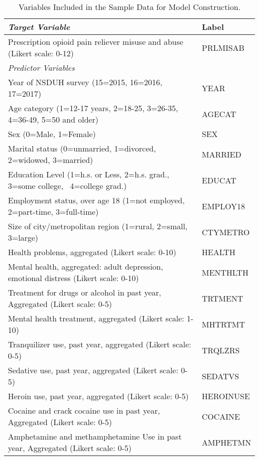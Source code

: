 \documentclass[sigconf]{acmart}
\begin{document}
\begin{table*}[ht]
  \caption{Variables Included in the Sample Data for Model Construction.}
  \label{tab:freq}
  \begin{tabular}{ll}
    \toprule
    \textit{Target Variable} & Label \\
    \midrule
    Prescription opioid pain reliever misuse and abuse 
    (Likert scale: 0-12)& PRLMISAB  \\
    \midrule
    \textit{Predictor Variables}&   \\
    \midrule
    Year of NSDUH survey (15=2015, 16=2016, 17=2017) & YEAR  \\
    Age category (1=12-17 years, 2=18-25, 3=26-35, 4=36-49, 5=50 and older)& AGECAT \\
    Sex (0=Male, 1=Female)& SEX  \\
    Marital status (0=unmarried, 1=divorced, 2=widowed, 3=married)& MARRIED  \\
    Education Level (1=h.s. or Less, 2=h.s. grad., 3=some college,  4=college grad.)& EDUCAT  \\
    Employment status, over age 18 (1=not employed, 2=part-time, 3=full-time) & EMPLOY18  \\
    Size of city/metropolitan region (1=rural, 2=small, 3=large)& CTYMETRO  \\
    Health problems, aggregated  (Likert scale: 0-10)& HEALTH  \\
    Mental health, aggregated: adult depression, emotional distress 
    (Likert scale: 0-10)& MENTHLTH  \\
    Treatment for drugs or alcohol in past year, Aggregated 
    (Likert scale: 0-5)& TRTMENT  \\
    Mental health treatment, aggregated (Likert scale: 1-10)& MHTRTMT  \\
    Tranquilizer use, past year, aggregated (Likert scale: 0-5)& TRQLZRS \\
    Sedative use, past year, aggregated (Likert scale: 0-5)& SEDATVS  \\
    Heroin use, past year, aggregated (Likert scale: 0-5)& HEROINUSE  \\
    Cocaine and crack cocaine use in past year, Aggregated  
    (Likert scale: 0-5)& COCAINE  \\
    Amphetamine and methamphetamine Use in past year, Aggregated 
    (Likert scale: 0-5)& AMPHETMN  \\
    \bottomrule
  \end{tabular}
\end{table*}
\end{document}
